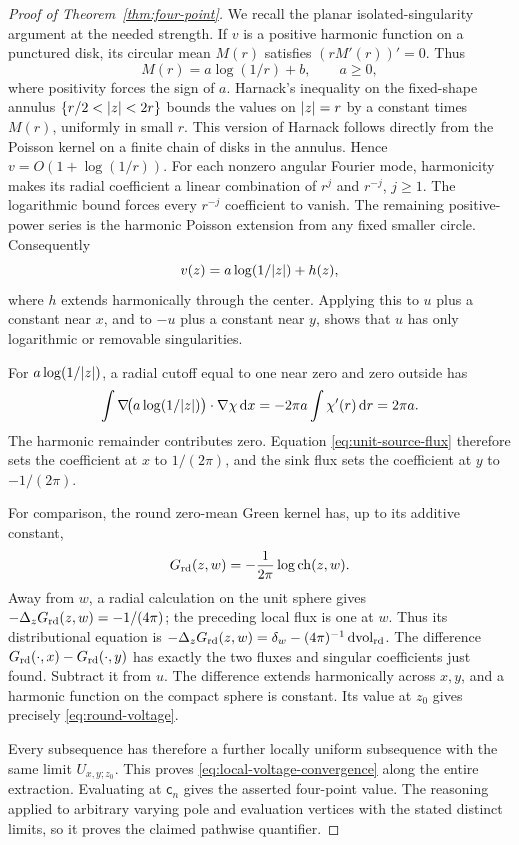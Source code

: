 \begin{proof}[Proof of Theorem~\ref{thm:four-point}]
We recall the planar isolated-singularity argument at the needed strength.
If \(v\) is a positive harmonic function on a punctured disk, its circular
mean \(M(r)\) satisfies \((rM'(r))'=0\).  Thus
\[
                       M(r)=a\log(1/r)+b,\qquad a\ge0,
\]
where positivity forces the sign of \(a\).  Harnack's inequality on
the fixed-shape annulus \(\{r/2<\lvert z\rvert<2r\}\) bounds the values on
\(\lvert z\rvert=r\) by a constant times \(M(r)\), uniformly in small \(r\).
This version of Harnack follows directly from the Poisson kernel on a
finite chain of disks in the annulus.  Hence \(v=O(1+\log(1/r))\).
For each nonzero angular Fourier mode, harmonicity makes its radial
coefficient a linear combination of \(r^j\) and \(r^{-j}\),
\(j\ge1\).  The logarithmic bound forces every \(r^{-j}\) coefficient
to vanish.  The remaining positive-power series is the harmonic Poisson
extension from any fixed smaller circle.  Consequently
\[
                     v(z)=a\log(1/\lvert z\rvert)+h(z),
\]
where \(h\) extends harmonically through the center.  Applying this to
\(u\) plus a constant near \(x\), and to \(-u\) plus a constant near
\(y\), shows that \(u\) has only logarithmic or removable singularities.

For \(a\log(1/\lvert z\rvert)\), a radial cutoff equal to one near zero and zero
outside has
\[
 \int\nabla\!\bigl(a\log(1/\lvert z\rvert)\bigr)\cdot\nabla\chi\,\mathrm d x
       =-2\pi a\int\chi'(r)\,\mathrm d r=2\pi a.
\]
The harmonic remainder contributes zero.  Equation
\eqref{eq:unit-source-flux} therefore sets the coefficient at \(x\)
to \(1/(2\pi)\), and the sink flux sets the coefficient at \(y\) to
\(-1/(2\pi)\).

For comparison, the round zero-mean Green kernel has, up to its additive
constant,
\[
                  G_{\rm rd}(z,w)
                  =-\frac1{2\pi}\log\operatorname{ch}(z,w).
\]
Away from \(w\), a radial calculation on the unit sphere gives
\(-\Delta_z G_{\rm rd}(z,w)=-1/(4\pi)\); the preceding local flux is
one at \(w\).  Thus its distributional equation is
\(-\Delta_zG_{\rm rd}(z,w)=\delta_w-(4\pi)^{-1}\,\mathrm d\mathrm{vol}_{\rm rd}\).
The difference \(G_{\rm rd}(\cdot,x)-G_{\rm rd}(\cdot,y)\) has exactly
the two fluxes and singular coefficients just found.  Subtract it from
\(u\).  The difference extends harmonically across \(x,y\), and a
harmonic function on the compact sphere is constant.  Its value at
\(z_0\) gives precisely \eqref{eq:round-voltage}.

Every subsequence has therefore a further locally uniform subsequence with
the same limit \(U_{x,y;z_0}\).  This proves
\eqref{eq:local-voltage-convergence} along the entire extraction.
Evaluating at \(\mathsf c_n\) gives the asserted four-point value.  The reasoning
applied to arbitrary varying pole and evaluation vertices with the stated
distinct limits, so it proves the claimed pathwise quantifier.
\end{proof}
